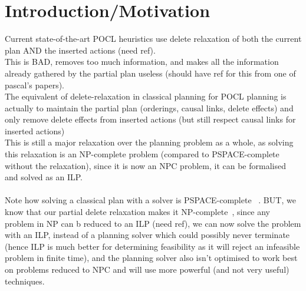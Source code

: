 \documentclass[runningheads]{llncs}
\begin{document}
\section{Introduction/Motivation}
Current state-of-the-art POCL heuristics use delete relaxation of both the current plan AND the inserted actions (need ref).\\
This is BAD, removes too much information, and makes all the information already gathered by the partial plan useless (should have ref for this from one of pascal's papers).\\
The equivalent of delete-relaxation in classical planning for POCL planning is actually to maintain the partial plan (orderings, causal links, delete effects) and only remove delete effects from inserted actions (but still respect causal links for inserted actions)\\
This is still a major relaxation over the planning problem as a whole, as solving this relaxation is an NP-complete problem (compared to PSPACE-complete without the relaxation), since it is now an NPC problem, it can be formalised and solved as an ILP. 
\\\\
Note how solving a classical plan with a solver is PSPACE-complete ~\cite{Bercher2021POCLComplexities}. BUT, we know that our partial delete relaxation makes it NP-complete~\cite{Bercher2021POCLComplexities}, since any problem in NP can b reduced to an ILP (need ref), we can now solve the problem with an ILP, instead of a planning solver which could possibly never terminate (hence ILP is much better for determining feasibility as it will reject an infeasible problem in finite time), and the planning solver also isn't optimised to work best on problems reduced to NPC and will use more powerful (and not very useful) techniques.
\end{document}
